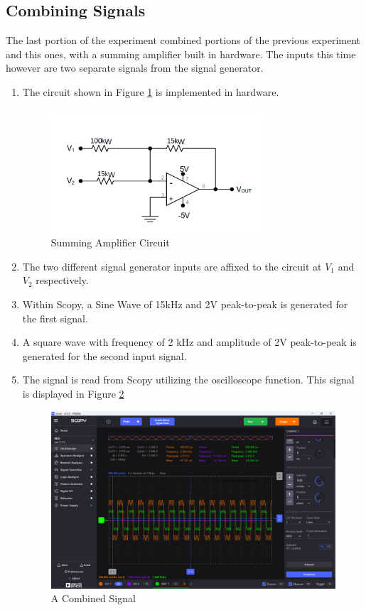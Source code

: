 \documentclass[12pt]{article}
\begin{document}
\subsection{Combining Signals}
The last portion of the experiment combined portions of the previous experiment
and this ones, with a summing amplifier built in hardware. The inputs this time
however are two separate signals from the signal generator.
\begin{enumerate}
	\item The circuit shown in Figure \ref{fig:sumamp} is implemented in hardware.
	      \begin{figure}[H]
		      \centering
		      \includegraphics[width=8cm]{04_10}
		      \caption{Summing Amplifier Circuit}
		      \label{fig:sumamp}
	      \end{figure}
	\item The two different signal generator inputs are affixed to the circuit
	      at \(V_1\) and \(V_2\) respectively.
	\item Within Scopy, a Sine Wave of 15kHz and 2V peak-to-peak is generated
	      for the first signal.
	\item A square wave with frequency of 2 kHz and amplitude of 2V
	      peak-to-peak is generated for the second input signal.
	\item The signal is read from Scopy utilizing the oscilloscope function.
	      This signal is displayed in Figure \ref{fig:concat}

	      \begin{figure}[H]
		      \centering
		      \includegraphics[width=14cm]{04_06}
		      \caption{A Combined Signal}
		      \label{fig:concat}
	      \end{figure}
\end{enumerate}
\end{document}
